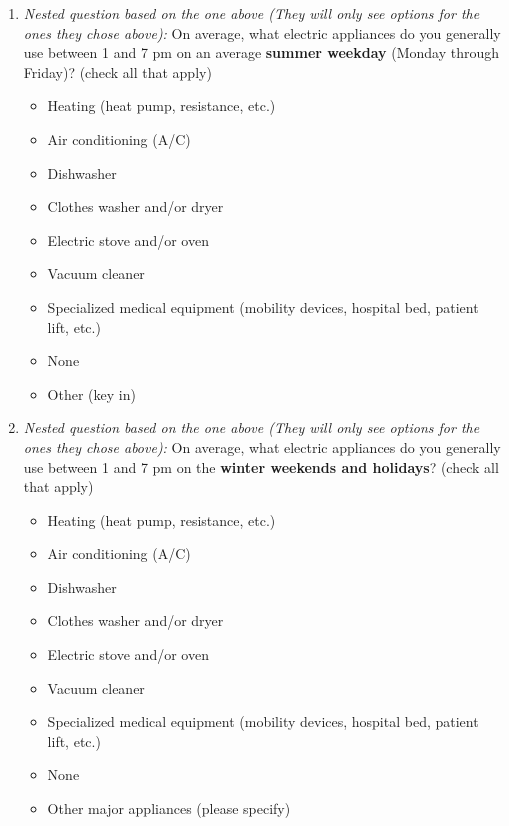 \documentclass{article}
\begin{document}
\begin{enumerate}
\item \textit{Nested question based on the one above (They will only see options for the ones they chose above):}
On average, what electric appliances do you generally use between 1 and 7 pm on an average \textbf{summer weekday} (Monday through Friday)? (check all that apply)
\begin{itemize}
  \item[\checkbox] Heating (heat pump, resistance, etc.)
  \item[\checkbox] Air conditioning (A/C)
  \item[\checkbox] Dishwasher
  \item[\checkbox] Clothes washer and/or dryer
  \item[\checkbox] Electric stove and/or oven
  \item[\checkbox] Vacuum cleaner
  \item[\checkbox] Specialized medical equipment (mobility devices, hospital bed, patient lift, etc.)
  \item[\checkbox] None
  \item[\checkbox] Other (key in)
\end{itemize}
 

\item \textit{Nested question based on the one above (They will only see options for the ones they chose above):}
On average, what electric appliances do you generally use between 1 and 7 pm on the \textbf{winter weekends and holidays}? (check all that apply)
\begin{itemize}
  \item[\checkbox] Heating (heat pump, resistance, etc.)
  \item[\checkbox] Air conditioning (A/C)
  \item[\checkbox] Dishwasher
  \item[\checkbox] Clothes washer and/or dryer
  \item[\checkbox] Electric stove and/or oven
  \item[\checkbox] Vacuum cleaner
  \item[\checkbox] Specialized medical equipment (mobility devices, hospital bed, patient lift, etc.)
  \item[\checkbox] None
  \item[\checkbox] Other major appliances (please specify)
\end{itemize}
 


\end{enumerate}
\end{document}
